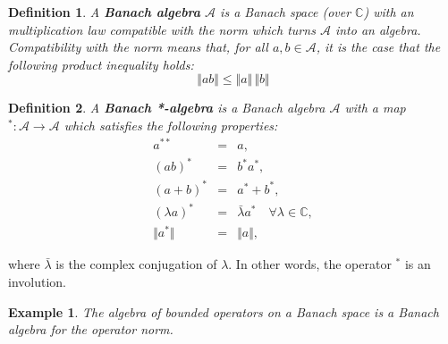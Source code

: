 \documentclass[12pt]{article}
\newcommand*{\Cset}{\mathbb{C}}
\newcommand*{\norm}[1]{\Vert #1\Vert}
\theoremstyle{inlinedefn}
\newtheorem{definition}{Definition}
\theoremstyle{break}
\newtheorem{example}{Example}
\begin{document}
\begin{definition}
A \textbf{Banach algebra} $\mathcal{A}$ is a Banach space (over $\mathbb{C}$) with an multiplication law compatible with the norm which turns $\mathcal{A}$ into an algebra.  Compatibility with the norm means that, for all $a,b \in \mathcal{A}$, it is the case that the following product inequality holds:
 \[ \norm{ab} \leq \norm{a}\,\norm{b} \]
\end{definition}

\begin{definition}
A \textbf{Banach *-algebra} is a Banach algebra $\mathcal{A}$ with a map ${}^* \colon \mathcal{A} \to \mathcal{A}$ which satisfies the following properties:
\begin{eqnarray}
a^{**} & = & a, \\
(ab)^* & = & b^* a^*, \\
(a+b)^* & = & a^* + b^*, \\
(\lambda a)^* & = & \bar{\lambda} a^* \quad\forall\lambda\in\Cset, \\
\norm{a^*} & = & \norm{a},
\end{eqnarray}
\end{definition}
where $\bar{\lambda}$ is the complex conjugation of $\lambda$.  In other words, the operator $^*$ is an involution.

\begin{example}
The algebra of bounded operators on a Banach space is a Banach algebra
for the operator norm.
\end{example}
\end{document}
